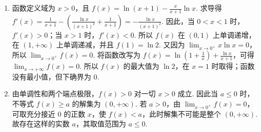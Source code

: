 \begin{solution}
\begin{enumerate}
\item 函数定义域为 \(x>0\)，且 \(f(x)=\ln(x+1)-\frac{x}{x+1}\ln x\). 求导得 \(f'(x)=\frac{1}{x+1}-\left(\frac{\ln x}{(x+1)^2}+\frac{1}{x+1}\right)=-\frac{\ln x}{(x+1)^2}\). 因此，当 \(0<x<1\) 时，\(f'(x)>0\)；当 \(x>1\) 时，\(f'(x)<0\). 所以 \(f(x)\) 在 \((0,1)\) 上单调递增，在 \((1,+\infty)\) 上单调递减，并且 \(f(1)=\ln2\). 又因为 \(\lim_{x\to0^+}x\ln x=0\)，所以 \(\lim_{x\to0^+}f(x)=0\). 将函数改写为 \(f(x)=\ln\left(1+\frac{1}{x}\right)+\frac{\ln x}{x+1}\)，可得 \(\lim_{x\to+\infty}f(x)=0\). 所以 \(f(x)\) 的最大值为 \(\ln2\)，在 \(x=1\) 时取得；函数没有最小值，但下确界为 \(0\).

\item 由单调性和两个端点极限，\(f(x)>0\) 对一切 \(x>0\) 成立. 因此当 \(a\leqslant0\) 时，不等式 \(f(x)\geqslant a\) 的解集为 \((0,+\infty)\). 若 \(a>0\)，由 \(\lim_{x\to0^+}f(x)=0\)，可取充分接近 \(0\) 的正数 \(x\)，使 \(f(x)<a\)，此时解集不可能是整个 \((0,+\infty)\). 故存在这样的实数 \(a\)，其取值范围为 \(a\leqslant0\).
\end{enumerate}
\end{solution}
